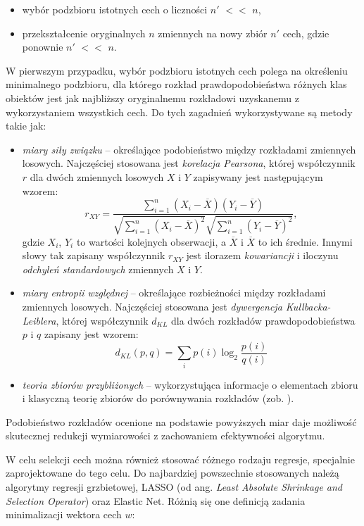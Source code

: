 \begin{itemize}
\item wybór podzbioru istotnych cech o liczności $n'$ $<<$ $n$,
\item przekształcenie oryginalnych $n$ zmiennych na nowy zbiór $n'$ cech, gdzie ponownie $n'$ $<<$ $n$.
\end{itemize}

W pierwszym przypadku, wybór podzbioru istotnych cech polega na określeniu minimalnego podzbioru, dla którego rozkład prawdopodobieństwa różnych klas obiektów jest jak najbliższy oryginalnemu rozkładowi uzyskanemu z wykorzystaniem wszystkich cech. Do tych zagadnień wykorzystywane są metody takie jak:
\begin{itemize}
	\item \textit{miary siły związku} -- określające podobieństwo między rozkładami zmiennych losowych. Najczęściej stosowana jest \textit{korelacja Pearsona}, której współczynnik $r$ dla dwóch zmiennych losowych $X$ i $Y$ zapisywany jest następującym wzorem:
	\begin{equation}
	r_{XY} = \frac{\sum_{i=1}^n (X_i - \overline{X})(Y_i - \overline{Y})}{\sqrt{\sum_{i=1}^n (X_i - \overline{X})^2} \sqrt{\sum_{i=1}^n (Y_i - \overline{Y})^2}},
	\end{equation}
	gdzie $X_i$, $Y_i$ to wartości kolejnych obserwacji, a $\overline{X}$ i $\overline{X}$ to ich średnie. Innymi słowy tak zapisany współczynnik $r_{XY}$ jest ilorazem \textit{kowariancji} i iloczynu \textit{odchyleń standardowych} zmiennych $X$ i $Y$.
	\item \textit{miary entropii względnej} --  określające rozbieżności między rozkładami zmiennych losowych. Najczęściej stosowana jest \textit{dywergencja Kullbacka-Leiblera}, której współczynnik $d_{KL}$ dla dwóch rozkładów prawdopodobieństwa $p$ i $q$ zapisany jest wzorem: 
	\begin{equation}
	d_{KL}(p,q) = \sum_{i} p(i) \log_2 \frac{p(i)}{q(i)}
	\end{equation}
	\item \textit{teoria zbiorów przybliżonych} -- wykorzystująca informacje o elementach zbioru i klasyczną teorię zbiorów do porównywania rozkładów (zob. \cite{Kowalik2003}).
\end{itemize}
Podobieństwo rozkładów ocenione na podstawie powyższych miar daje możliwość skutecznej redukcji wymiarowości z zachowaniem efektywności algorytmu.

W celu selekcji cech można również stosować różnego rodzaju regresje, specjalnie zaprojektowane do tego celu. Do najbardziej powszechnie stosowanych należą algorytmy regresji grzbietowej, LASSO (od ang. \textit{Least Absolute Shrinkage and Selection Operator}) oraz Elastic Net. Różnią się one definicją zadania minimalizacji wektora cech $w$:

